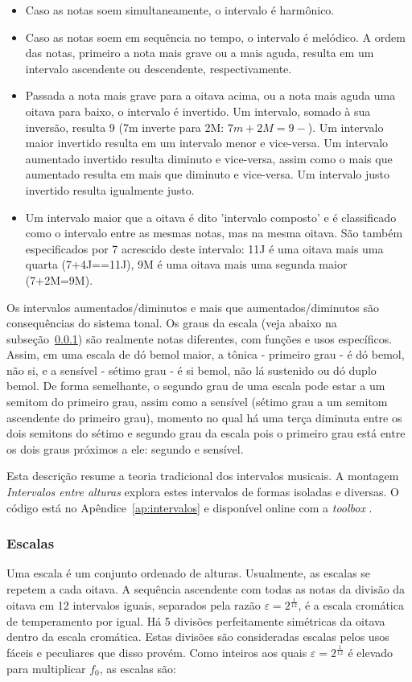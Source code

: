 \begin{itemize}
        \item Caso as notas soem simultaneamente, o intervalo é harmônico.
        \item Caso as notas soem em sequência no tempo, o intervalo é melódico. A ordem das notas, primeiro a nota mais grave ou a mais aguda, resulta em um intervalo ascendente ou descendente, respectivamente. 
        \item Passada a nota mais grave para a oitava acima, ou a nota mais aguda uma oitava para baixo, o intervalo é invertido. Um intervalo, somado à sua inversão, resulta 9 (7m inverte para 2M: $7m+2M=9-$). Um intervalo maior invertido resulta em um intervalo menor e vice-versa. Um intervalo aumentado invertido resulta diminuto e vice-versa, assim como o mais que aumentado resulta em mais que diminuto e vice-versa. Um intervalo justo invertido resulta igualmente justo.
        \item Um intervalo maior que a oitava é dito 'intervalo composto' e é classificado como o intervalo entre as mesmas notas, mas na mesma oitava. São também especificados por 7 acrescido deste intervalo: 11J é uma oitava mais uma quarta (7+4J==11J), 9M é uma oitava mais uma segunda maior (7+2M=9M).
\end{itemize}

Os intervalos aumentados/diminutos e mais que aumentados/diminutos são consequências do sistema tonal. Os graus da escala (veja abaixo na subseção~\ref{subsec:escalas}) são realmente notas diferentes, com funções e usos específicos. Assim, em uma escala de dó bemol maior, a tônica - primeiro grau - é dó bemol, não si, e a sensível - sétimo grau - é si bemol, não lá sustenido ou dó duplo bemol. De forma semelhante, o segundo grau de uma escala pode estar a um semitom do primeiro grau, assim como a sensível (sétimo grau a um semitom ascendente do primeiro grau), momento no qual há uma terça diminuta entre os dois semitons do sétimo e segundo grau da escala pois o primeiro grau está entre os dois graus próximos a ele: segundo e sensível.\cite{Lacerda}

Esta descrição resume a teoria tradicional dos intervalos musicais.\cite{Lacerda} A montagem \emph{Intervalos entre alturas} explora estes intervalos de formas isoladas e diversas. O código está no Apêndice~\ref{ap:intervalos} e disponível online com a \emph{toolbox} \massa.\cite{MASSA}


\subsubsection{Escalas}\label{subsec:escalas}
Uma escala é um conjunto ordenado de alturas. Usualmente, as escalas se repetem
a cada oitava. A sequência ascendente com todas as notas da divisão da oitava em 12 intervalos iguais,
separados pela razão $\varepsilon=2^{\frac{1}{12}}$, é a escala cromática de temperamento por igual. Há 5 divisões perfeitamente simétricas da oitava dentro da escala cromática. Estas divisões são consideradas
escalas pelos usos fáceis e peculiares que disso provém. Como inteiros aos quais $\varepsilon=2^{\frac{1}{12}}$ é elevado
para multiplicar $f_0$, as escalas são:


